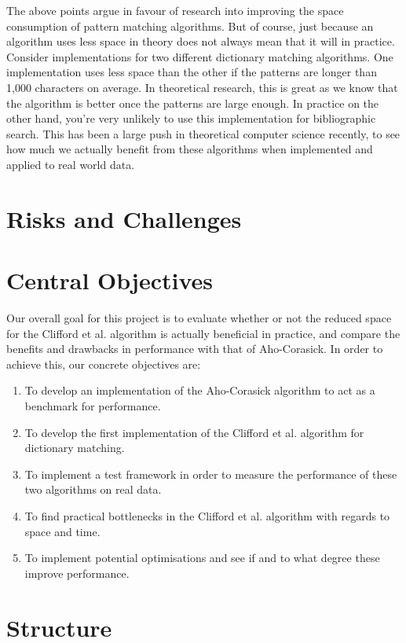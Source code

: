 \documentclass[ %
                    author={Dominic Joseph Moylett},
                    degree={MEng},
                     title={Dictionary Matching with Fingerprints},
                  subtitle={An Empirical Analysis},
                      type={research},
                      year={2015} ]{dissertation}
\begin{document}
The above points argue in favour of research into improving the space consumption of pattern matching algorithms. But of course, just because an algorithm uses less space in theory does not always mean that it will in practice. Consider implementations for two different dictionary matching algorithms. One implementation uses less space than the other if the patterns are longer than 1,000 characters on average. In theoretical research, this is great as we know that the algorithm is better once the patterns are large enough. In practice on the other hand, you're very unlikely to use this implementation for bibliographic search. This has been a large push in theoretical computer science recently, to see how much we actually benefit from these algorithms when implemented and applied to real world data.

\section{Risks and Challenges}

\section{Central Objectives}

Our overall goal for this project is to evaluate whether or not the reduced space for the Clifford et al. algorithm is actually beneficial in practice, and compare the benefits and drawbacks in performance with that of Aho-Corasick. In order to achieve this, our concrete objectives are:

\begin{enumerate}
  \item To develop an implementation of the Aho-Corasick algorithm to act as a benchmark for performance.
  \item To develop the first implementation of the Clifford et al. algorithm for dictionary matching.
  \item To implement a test framework in order to measure the performance of these two algorithms on real data.
  \item To find practical bottlenecks in the Clifford et al. algorithm with regards to space and time.
  \item To implement potential optimisations and see if and to what degree these improve performance.
\end{enumerate}

\section{Structure}
\end{document}
